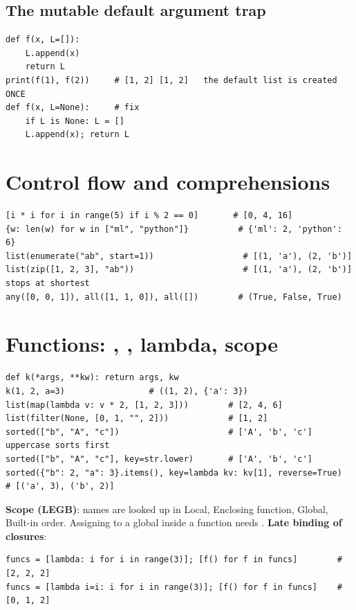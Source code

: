 \subsection{The mutable default argument trap}
\begin{lstlisting}
def f(x, L=[]):
    L.append(x)
    return L
print(f(1), f(2))     # [1, 2] [1, 2]   the default list is created ONCE
def f(x, L=None):     # fix
    if L is None: L = []
    L.append(x); return L
\end{lstlisting}

\section{Control flow and comprehensions}
\begin{lstlisting}
[i * i for i in range(5) if i % 2 == 0]       # [0, 4, 16]
{w: len(w) for w in ["ml", "python"]}          # {'ml': 2, 'python': 6}
list(enumerate("ab", start=1))                  # [(1, 'a'), (2, 'b')]
list(zip([1, 2, 3], "ab"))                      # [(1, 'a'), (2, 'b')]   stops at shortest
any([0, 0, 1]), all([1, 1, 0]), all([])        # (True, False, True)
\end{lstlisting}

\section{Functions: , , lambda, scope}
\begin{lstlisting}
def k(*args, **kw): return args, kw
k(1, 2, a=3)                 # ((1, 2), {'a': 3})
list(map(lambda v: v * 2, [1, 2, 3]))        # [2, 4, 6]
list(filter(None, [0, 1, "", 2]))            # [1, 2]
sorted(["b", "A", "c"])                      # ['A', 'b', 'c']   uppercase sorts first
sorted(["b", "A", "c"], key=str.lower)       # ['A', 'b', 'c']
sorted({"b": 2, "a": 3}.items(), key=lambda kv: kv[1], reverse=True)  # [('a', 3), ('b', 2)]
\end{lstlisting}
\textbf{Scope (LEGB)}: names are looked up in Local, Enclosing function, Global, Built-in order. Assigning to a global inside a function needs .
\textbf{Late binding of closures}:
\begin{lstlisting}
funcs = [lambda: i for i in range(3)]; [f() for f in funcs]        # [2, 2, 2]
funcs = [lambda i=i: i for i in range(3)]; [f() for f in funcs]    # [0, 1, 2]
\end{lstlisting}

